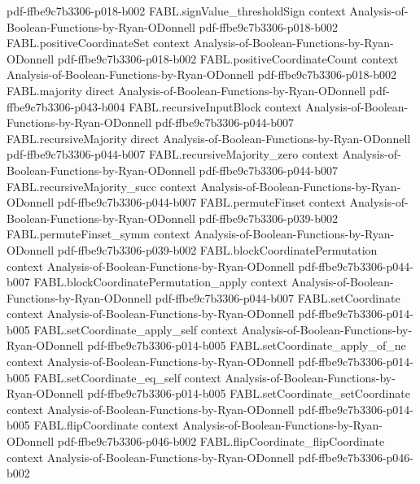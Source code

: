 \begin{theorem}
  {pdf-ffbe9c7b3306-p018-b002}
\proofstep
  {FABL.signValue_thresholdSign}
  {context}
  {Analysis-of-Boolean-Functions-by-Ryan-ODonnell}
  {pdf-ffbe9c7b3306-p018-b002}
\proofstep
  {FABL.positiveCoordinateSet}
  {context}
  {Analysis-of-Boolean-Functions-by-Ryan-ODonnell}
  {pdf-ffbe9c7b3306-p018-b002}
\proofstep
  {FABL.positiveCoordinateCount}
  {context}
  {Analysis-of-Boolean-Functions-by-Ryan-ODonnell}
  {pdf-ffbe9c7b3306-p018-b002}
\proofstep
  {FABL.majority}
  {direct}
  {Analysis-of-Boolean-Functions-by-Ryan-ODonnell}
  {pdf-ffbe9c7b3306-p043-b004}
\proofstep
  {FABL.recursiveInputBlock}
  {context}
  {Analysis-of-Boolean-Functions-by-Ryan-ODonnell}
  {pdf-ffbe9c7b3306-p044-b007}
\proofstep
  {FABL.recursiveMajority}
  {direct}
  {Analysis-of-Boolean-Functions-by-Ryan-ODonnell}
  {pdf-ffbe9c7b3306-p044-b007}
\proofstep
  {FABL.recursiveMajority_zero}
  {context}
  {Analysis-of-Boolean-Functions-by-Ryan-ODonnell}
  {pdf-ffbe9c7b3306-p044-b007}
\proofstep
  {FABL.recursiveMajority_succ}
  {context}
  {Analysis-of-Boolean-Functions-by-Ryan-ODonnell}
  {pdf-ffbe9c7b3306-p044-b007}
\proofstep
  {FABL.permuteFinset}
  {context}
  {Analysis-of-Boolean-Functions-by-Ryan-ODonnell}
  {pdf-ffbe9c7b3306-p039-b002}
\proofstep
  {FABL.permuteFinset_symm}
  {context}
  {Analysis-of-Boolean-Functions-by-Ryan-ODonnell}
  {pdf-ffbe9c7b3306-p039-b002}
\proofstep
  {FABL.blockCoordinatePermutation}
  {context}
  {Analysis-of-Boolean-Functions-by-Ryan-ODonnell}
  {pdf-ffbe9c7b3306-p044-b007}
\proofstep
  {FABL.blockCoordinatePermutation_apply}
  {context}
  {Analysis-of-Boolean-Functions-by-Ryan-ODonnell}
  {pdf-ffbe9c7b3306-p044-b007}
\proofstep
  {FABL.setCoordinate}
  {context}
  {Analysis-of-Boolean-Functions-by-Ryan-ODonnell}
  {pdf-ffbe9c7b3306-p014-b005}
\proofstep
  {FABL.setCoordinate_apply_self}
  {context}
  {Analysis-of-Boolean-Functions-by-Ryan-ODonnell}
  {pdf-ffbe9c7b3306-p014-b005}
\proofstep
  {FABL.setCoordinate_apply_of_ne}
  {context}
  {Analysis-of-Boolean-Functions-by-Ryan-ODonnell}
  {pdf-ffbe9c7b3306-p014-b005}
\proofstep
  {FABL.setCoordinate_eq_self}
  {context}
  {Analysis-of-Boolean-Functions-by-Ryan-ODonnell}
  {pdf-ffbe9c7b3306-p014-b005}
\proofstep
  {FABL.setCoordinate_setCoordinate}
  {context}
  {Analysis-of-Boolean-Functions-by-Ryan-ODonnell}
  {pdf-ffbe9c7b3306-p014-b005}
\proofstep
  {FABL.flipCoordinate}
  {context}
  {Analysis-of-Boolean-Functions-by-Ryan-ODonnell}
  {pdf-ffbe9c7b3306-p046-b002}
\proofstep
  {FABL.flipCoordinate_flipCoordinate}
  {context}
  {Analysis-of-Boolean-Functions-by-Ryan-ODonnell}
  {pdf-ffbe9c7b3306-p046-b002}

\end{theorem}
